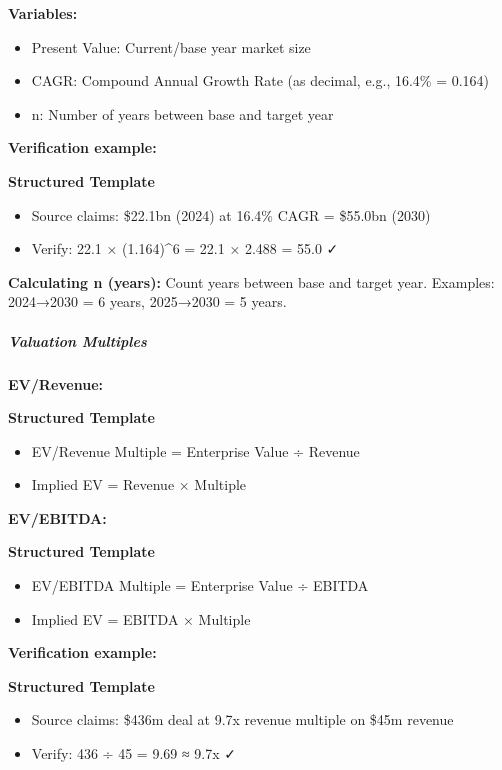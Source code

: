 \documentclass[11pt]{article}
\begin{document}
\textbf{Variables:}

\begin{itemize}[leftmargin=*,itemsep=2pt,topsep=2pt]
\item {} Present Value: Current/base year market size
\item {} CAGR: Compound Annual Growth Rate (as decimal, e.g., 16.4\% = 0.164)
\item {} n: Number of years between base and target year
\end{itemize}

\textbf{Verification example:}

\textbf{Structured Template}
\begin{itemize}[leftmargin=*,itemsep=2pt,topsep=2pt]
\item {} Source claims: \$22.1bn (2024) at 16.4\% CAGR = \$55.0bn (2030)
\item {} Verify: 22.1 × (1.164)\textasciicircum{}6 = 22.1 × 2.488 = 55.0 ✓
\end{itemize}

\textbf{Calculating n (years):} Count years between base and target year. Examples: 2024→2030 = 6 years, 2025→2030 = 5 years.


\subparagraph{Valuation Multiples}\mbox{}\par

\textbf{EV/Revenue:}

\textbf{Structured Template}
\begin{itemize}[leftmargin=*,itemsep=2pt,topsep=2pt]
\item {} EV/Revenue Multiple = Enterprise Value ÷ Revenue
\item {} Implied EV = Revenue × Multiple
\end{itemize}

\textbf{EV/EBITDA:}

\textbf{Structured Template}
\begin{itemize}[leftmargin=*,itemsep=2pt,topsep=2pt]
\item {} EV/EBITDA Multiple = Enterprise Value ÷ EBITDA
\item {} Implied EV = EBITDA × Multiple
\end{itemize}

\textbf{Verification example:}

\textbf{Structured Template}
\begin{itemize}[leftmargin=*,itemsep=2pt,topsep=2pt]
\item {} Source claims: \$436m deal at 9.7x revenue multiple on \$45m revenue
\item {} Verify: 436 ÷ 45 = 9.69 ≈ 9.7x ✓
\end{itemize}
\end{document}
